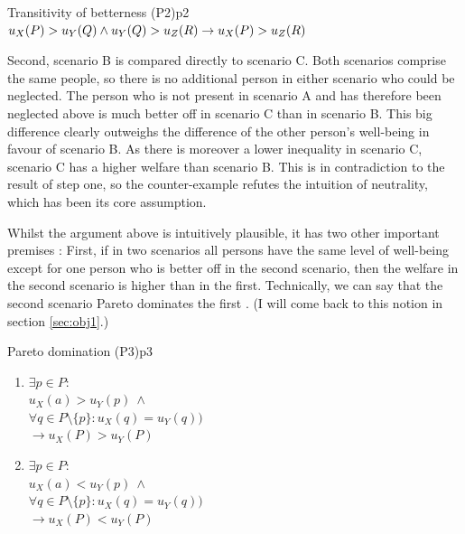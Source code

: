 \begin{Premise}{Transitivity of betterness (P2)}{p2}
$
  u_X(P) > u_Y(Q) \wedge u_Y(Q) > u_Z(R) \\
  \rightarrow
  u_X(P) > u_Z(R)
$
\end{Premise}

Second, scenario B is compared directly to scenario C. Both scenarios comprise the same people, so there is no additional person in either scenario who could be neglected. The person who is not present in scenario A and has therefore been neglected above is much better off in scenario C than in scenario B. This big difference clearly outweighs the difference of the other person’s well-being in favour of scenario B. As there is moreover a lower inequality in scenario C, scenario C has a higher welfare than scenario B. This is in contradiction to the result of step one, so the counter-example refutes the intuition of neutrality, which has been its core assumption.  

Whilst the argument above is intuitively plausible, it has two other important premises \cite[p.~177f]{broome_2012}: First, if in two scenarios all persons have the same level of well-being except for one person who is better off in the second scenario, then the welfare in the second scenario is higher than in the first. Technically, we can say that the second scenario Pareto dominates the first \cite{osborne_1997}. (I will come back to this notion in section \ref{sec:obj1}.)

\begin{Premise}{Pareto domination (P3)}{p3}
  \begin{enumerate}
  \item
    $
      \exists p \in P:
    $ \\
    \hspace*{1cm} $
      u_X(a) > u_Y(p) \ \wedge
    $ \\
    \hspace*{1cm} $
      \forall q \in P \setminus \{p\}: u_X(q) = u_Y(q) )
    $ \\
    \hspace*{.5cm} $
      \rightarrow
      u_X(P) > u_Y(P) 
    $
  \item
    $
      \exists p \in P:
    $ \\
    \hspace*{1cm} $
      u_X(a) < u_Y(p) \ \wedge
    $ \\
    \hspace*{1cm} $
      \forall q \in P \setminus \{p\}: u_X(q) = u_Y(q) )
    $ \\
    \hspace*{.5cm} $
      \rightarrow
      u_X(P) < u_Y(P) 
    $
  \end{enumerate}
\end{Premise}


